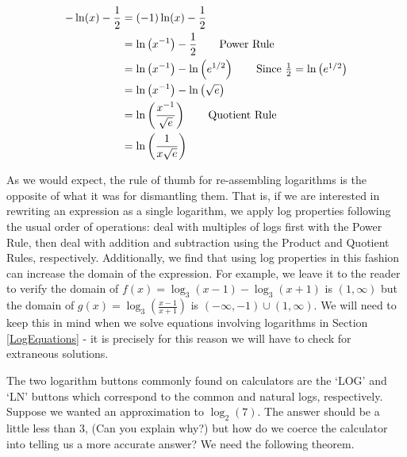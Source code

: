 {\begin{enumerate}
\begin{align*}
-\ln(x) - \frac{1}{2} & =  (-1)\ln(x) - \frac{1}{2}    \\ 
   & =  \ln\left(x^{-1}\right) - \frac{1}{2}  \tag*{Power Rule} \\
   & =  \ln\left(x^{-1}\right) - \ln\left(e^{1/2}\right) \tag*{Since $\frac{1}{2} = \ln\left(e^{1/2}\right)$} \\
   & =  \ln\left(x^{-1}\right) - \ln\left(\sqrt{e} \right) \\ 
   & =  \ln\left(\dfrac{x^{-1}}{\sqrt{e}}\right)  \tag*{Quotient Rule} \\ 
   & =  \ln\left(\dfrac{1}{x\sqrt{e}}\right) 
\end{align*}
\end{enumerate}
}

\medskip

As we would expect, the rule of thumb for re-assembling logarithms is the opposite of what it was for dismantling them.  That is, if we are interested in rewriting an expression as a single logarithm, we apply log properties following the usual order of operations:  deal with multiples of logs first with the Power Rule, then deal with addition and subtraction using the Product and Quotient Rules, respectively. Additionally, we find that using log properties in this fashion can increase the domain of the expression.  For example, we leave it to the reader to verify the domain of $f(x) = \log_{3}(x-1) - \log_{3}(x+1)$ is $(1,\infty)$ but the domain of $g(x) = \log_{3}\left(\frac{x-1}{x+1}\right)$ is $(-\infty, -1) \cup (1, \infty)$.  We will need to keep this in mind when we solve equations involving logarithms in Section \ref{LogEquations} - it is precisely for this reason we will have to check for extraneous solutions.

\smallskip

The two logarithm buttons commonly found on calculators are the `LOG' and `LN' buttons which correspond to the common and natural logs, respectively.  Suppose we wanted an approximation to $\log_{2}(7)$.  The answer should be a little less than $3$, (Can you explain why?) but how do we coerce the calculator into telling us a more accurate answer?  We need the following theorem.

\smallskip


